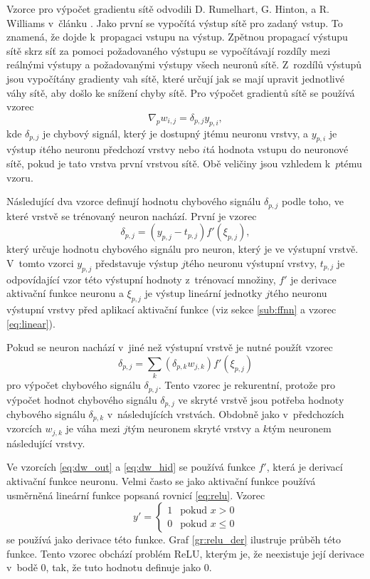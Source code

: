 Vzorce pro výpočet gradientu sítě odvodili D. Rumelhart, G. Hinton, a R. Williams v~článku \cite{Rumelhart1986}.
Jako první se vypočítá výstup sítě pro zadaný vstup.
To znamená, že dojde k~propagaci vstupu na výstup.
Zpětnou propagací výstupu sítě skrz síť za pomoci požadovaného výstupu se vypočítávají rozdíly mezi reálnými výstupy a požadovanými výstupy všech neuronů sítě.
Z~rozdílů výstupů jsou vypočítány gradienty vah sítě, které určují jak se mají upravit jednotlivé váhy sítě, aby došlo ke snížení chyby sítě.
Pro výpočet gradientů sítě se používá vzorec \begin{equation}\nabla_{p}w_{i,j}=\delta_{p,j}y_{p,i},\label{eq:dw}\end{equation} kde $\delta_{p,j}$ je chybový signál, který je dostupný jtému neuronu vrstvy, a $y_{p,i}$ je výstup $i$tého neuronu předchozí vrstvy nebo $i$tá hodnota vstupu do neuronové sítě, pokud je tato vrstva první vrstvou sítě.
Obě veličiny jsou vzhledem k~$p$tému vzoru.

Následující dva vzorce definují hodnotu chybového signálu $\delta_{p,j}$ podle toho, ve které vrstvě se trénovaný neuron nachází.
První je vzorec \begin{equation}\delta_{p,j}=(y_{p,j}-t_{p,j})f'(\xi_{p,j}),\label{eq:dw_out}\end{equation} který určuje hodnotu chybového signálu pro neuron, který je ve výstupní vrstvě.
V~tomto vzorci $y_{p,j}$ představuje výstup $j$tého neuronu výstupní vrstvy, $t_{p,j}$ je odpovídající vzor této výstupní hodnoty z~trénovací množiny, $f'$ je derivace aktivační funkce neuronu a $\xi_{p,j}$ je výstup lineární jednotky $j$tého neuronu výstupní vrstvy před aplikací aktivační funkce (viz sekce \ref{sub:ffnn} a vzorec \ref{eq:linear}).

Pokud se neuron nachází v~jiné než výstupní vrstvě je nutné použít vzorec \begin{equation}\delta_{p,j}=\sum_{k}{\left(\delta_{p,k}w_{j,k}\right)}f'(\xi_{p,j})\label{eq:dw_hid}\end{equation} pro výpočet chybového signálu $\delta_{p,j}$.
Tento vzorec je rekurentní, protože pro výpočet hodnot chybového signálu $\delta_{p,j}$ ve skryté vrstvě jsou potřeba hodnoty chybového signálu $\delta_{p,k}$ v~následujících vrstvách.
Obdobně jako v~předchozích vzorcích $w_{j,k}$ je váha mezi $j$tým neuronem skryté vrstvy a $k$tým neuronem následující vrstvy.

Ve vzorcích \ref{eq:dw_out} a \ref{eq:dw_hid} se používá funkce $f'$, která je derivací aktivační funkce neuronu.
Velmi často se jako aktivační funkce používá usměrněná lineární funkce popsaná rovnicí \ref{eq:relu}.
Vzorec \begin{equation}y'=\left \{\begin{array}{ll}1&\mbox{pokud }x>0\\0&\mbox{pokud }x\leq 0\end{array}\right.\label{eq:relu_der}\end{equation} se používá jako derivace této funkce.
Graf \ref{gr:relu_der} ilustruje průběh této funkce.
Tento vzorec obchází problém ReLU, kterým je, že neexistuje její derivace v~bodě 0, tak, že tuto hodnotu definuje jako 0.

